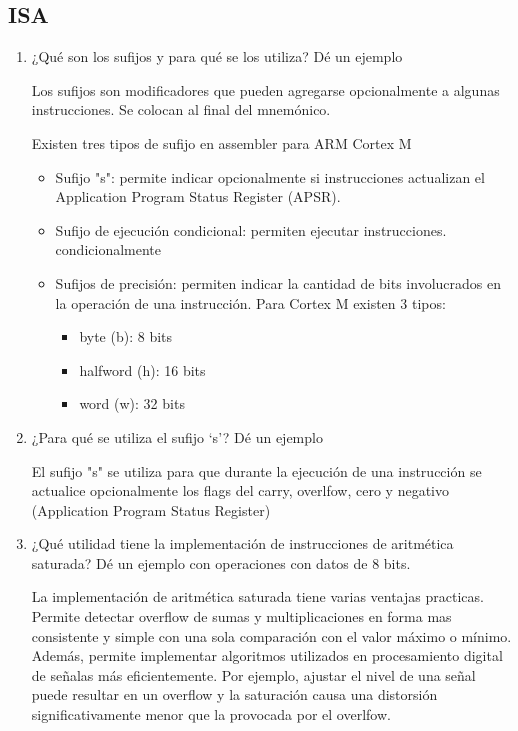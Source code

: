 \documentclass[12pt, a4paper]{article}
\begin{document}
\subsection{ISA}

\begin{enumerate}
    \item ¿Qué son los sufijos y para qué se los utiliza? Dé un ejemplo
    
    Los sufijos son modificadores que pueden agregarse opcionalmente a algunas instrucciones. Se 
    colocan al final del mnemónico.
    
    Existen tres tipos de sufijo en assembler para ARM Cortex M
    
    \begin{itemize}
        \item Sufijo "s": permite indicar opcionalmente si instrucciones actualizan el 
        Application Program Status Register (APSR).
        \item Sufijo de ejecución condicional: permiten ejecutar instrucciones.
        condicionalmente
        \item Sufijos de precisión: permiten indicar la cantidad de bits involucrados en la operación
        de una instrucción. Para Cortex M existen 3 tipos:
        \begin{itemize}
            \item byte (b): 8 bits
            \item halfword (h): 16 bits
            \item word (w): 32 bits
        \end{itemize}
    \end{itemize}

    \item ¿Para qué se utiliza el sufijo ‘s’? Dé un ejemplo
    
    El sufijo "s" se utiliza para que durante la ejecución de una instrucción se actualice 
    opcionalmente los flags del carry, overlfow, cero y negativo (Application Program Status Register)
    
    \item ¿Qué utilidad tiene la implementación de instrucciones de aritmética saturada? Dé un 
    ejemplo con operaciones con datos de 8 bits.
    
    La implementación de aritmética saturada tiene varias ventajas practicas. Permite detectar overflow 
    de sumas y multiplicaciones en forma mas consistente y simple con una sola comparación con el valor
    máximo o mínimo. Además, permite implementar algoritmos utilizados en procesamiento digital de
    señalas más eficientemente. Por ejemplo, ajustar el nivel de una señal puede resultar en un overflow
    y la saturación causa una distorsión significativamente menor que la provocada por el overlfow.
    

\end{enumerate}
\end{document}
